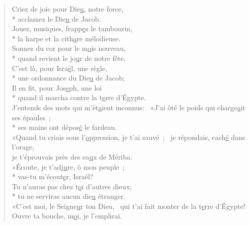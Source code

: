 
\begin{verse}
Criez de joie pour Die\underline{u}, notre force, \\*
acclamez le Die\underline{u} de Jacob. \\

Jouez, musiques, frapp\underline{e}z le tambourin, \\*
la harpe et la cith\underline{a}re mélodieuse. \\
Sonnez du cor pour le m\underline{o}is nouveau, \\*
quand revient le jo\underline{u}r de notre fête. \\

C’est là, pour Isra\underline{ë}l, une règle, \\*
une ordonnance du Die\underline{u} de Jacob; \\
Il en fit, pour Jos\underline{e}ph, une loi \\*
quand il marcha contre la t\underline{e}rre d’Égypte. \\

J’entends des mots qui m’ét\underline{a}ient inconnus:~\psalmdagger
{}«J’ai ôté le poids qui charge\underline{a}it ses épaules ; \\*
ses mains ont dépos\underline{é} le fardeau. \\

«Quand tu criais sous l’\underline{o}ppression, je t’ai sauvé ;~\psalmdagger
je répondais, cach\underline{é} dans l’orage, \\
je t’éprouvais près des ea\underline{u}x de Mériba. \\

«Écoute, je t’adj\underline{u}re, ô mon peuple ; \\*
vas-tu m’écout\underline{e}r, Israël? \\
Tu n’auras pas chez t\underline{o}i d’autres dieux, \\*
tu ne serviras aucun die\underline{u} étranger. \\

«C’est moi, le Seigne\underline{u}r ton Dieu,~\psalmdagger
qui t’ai fait monter de la t\underline{e}rre d’Égypte! \\
Ouvre ta bouche, m\underline{o}i, je l’emplirai. \\


\end{verse}
